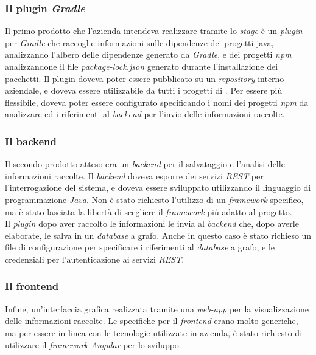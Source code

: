 \subsubsection*{Il plugin \textit{Gradle}}
Il primo prodotto che l'azienda intendeva realizzare tramite lo \textit{stage} è un \textit{plugin} per \textit{Gradle} che raccoglie informazioni sulle dipendenze dei progetti java, 
analizzando l'albero delle dipendenze generato da \textit{Gradle}, e dei progetti \textit{npm} analizzandone il file \textit{package-lock.json} generato
durante l'installazione dei pacchetti.
Il plugin doveva poter essere pubblicato su un \textit{repository} interno aziendale, e doveva essere utilizzabile da tutti i progetti di {\azienda}.
Per essere più flessibile, doveva poter essere configurato specificando i nomi dei progetti \textit{npm} da analizzare
ed i riferimenti al \textit{backend} per l'invio delle informazioni raccolte.\\

\subsubsection*{Il backend}
Il secondo prodotto atteso era un \textit{backend} per il salvataggio e l'analisi delle informazioni raccolte. 
Il \textit{backend} doveva esporre dei servizi \textit{REST} per l'interrogazione del sistema, e doveva essere sviluppato utilizzando
il linguaggio di programmazione \textit{Java}. Non è stato richiesto l'utilizzo di un \textit{framework} specifico, ma è stato lasciata
la libertà di scegliere il \textit{framework} più adatto al progetto.\\
Il \textit{plugin} dopo aver raccolto le informazioni
le invia al \textit{backend} che,  dopo averle elaborate, le salva in un \textit{database} a grafo.
Anche in questo caso è stato richieso un file di configurazione per specificare i riferimenti al \textit{database} a grafo, e le credenziali
per l'autenticazione ai servizi \textit{REST}.\\

\subsubsection*{Il frontend}
Infine, un'interfaccia grafica realizzata tramite una \textit{web-app} per la visualizzazione delle informazioni raccolte.
Le specifiche per il \textit{frontend} erano molto generiche, ma per essere in linea con le tecnologie utilizzate in azienda,
è stato richiesto di utilizzare il \textit{framework Angular} per lo sviluppo.\\

